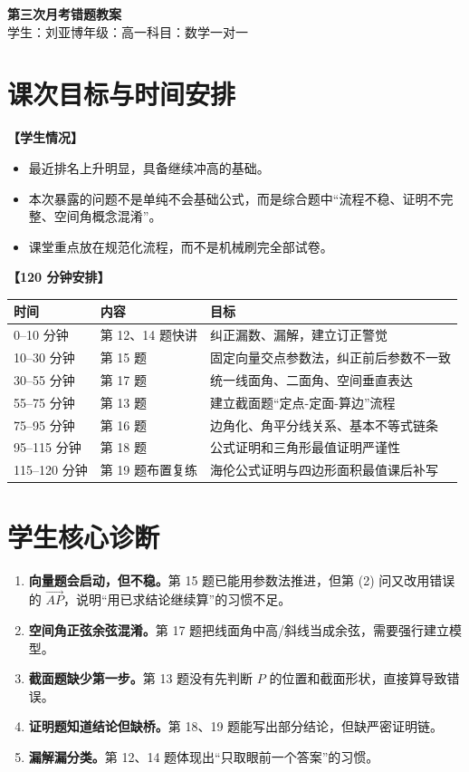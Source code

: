 \documentclass[11pt,a4paper]{ctexart}
\begin{document}
\begin{center}
  {\Large\bfseries 第三次月考错题教案}\\
  \vspace{0.5em}
  {\large 学生：刘亚博\quad 年级：高一\quad 科目：数学一对一}
\end{center}

\section{课次目标与时间安排}

\textbf{【学生情况】}
\begin{itemize}[label=\(\circ\), leftmargin=1.5em, itemsep=0.1em]
  \item 最近排名上升明显，具备继续冲高的基础。
  \item 本次暴露的问题不是单纯不会基础公式，而是综合题中“流程不稳、证明不完整、空间角概念混淆”。
  \item 课堂重点放在规范化流程，而不是机械刷完全部试卷。
\end{itemize}

\vspace{0.6em}
\textbf{【120 分钟安排】}\par
\begingroup
\small
\begin{tabularx}{\textwidth}{p{2.1cm}p{3.2cm}X}
\toprule
时间 & 内容 & 目标 \\
\midrule
0--10 分钟 & 第 12、14 题快讲 & 纠正漏数、漏解，建立订正警觉 \\
10--30 分钟 & 第 15 题 & 固定向量交点参数法，纠正前后参数不一致 \\
30--55 分钟 & 第 17 题 & 统一线面角、二面角、空间垂直表达 \\
55--75 分钟 & 第 13 题 & 建立截面题“定点-定面-算边”流程 \\
75--95 分钟 & 第 16 题 & 边角化、角平分线关系、基本不等式链条 \\
95--115 分钟 & 第 18 题 & 公式证明和三角形最值证明严谨性 \\
115--120 分钟 & 第 19 题布置复练 & 海伦公式证明与四边形面积最值课后补写 \\
\bottomrule
\end{tabularx}
\endgroup

\section{学生核心诊断}

\begin{enumerate}[label=\arabic*. , leftmargin=2em, itemsep=0.3em]
  \item \textbf{向量题会启动，但不稳。}第 15 题已能用参数法推进，但第 (2) 问又改用错误的 \(\vec{AP}\)，说明“用已求结论继续算”的习惯不足。
  \item \textbf{空间角正弦余弦混淆。}第 17 题把线面角中高/斜线当成余弦，需要强行建立模型。
  \item \textbf{截面题缺少第一步。}第 13 题没有先判断 \(P\) 的位置和截面形状，直接算导致错误。
  \item \textbf{证明题知道结论但缺桥。}第 18、19 题能写出部分结论，但缺严密证明链。
  \item \textbf{漏解漏分类。}第 12、14 题体现出“只取眼前一个答案”的习惯。
\end{enumerate}
\end{document}
